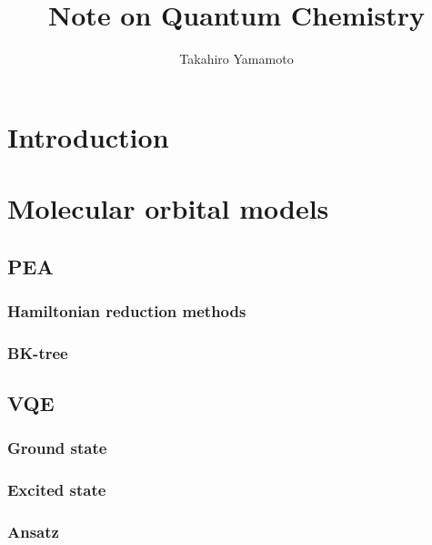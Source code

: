 \documentclass[11pt, oneside]{article}   	%
\title{Note on Quantum Chemistry}
\author{Takahiro Yamamoto}
\begin{document}
\maketitle
\section{Introduction}
\section{Molecular orbital models}
\subsection{PEA}
\subsubsection{Hamiltonian reduction methods}
\subsubsection{BK-tree}

\subsection{VQE}
\subsubsection{Ground state}
\subsubsection{Excited state}
\subsubsection{Ansatz}
\end{document}

